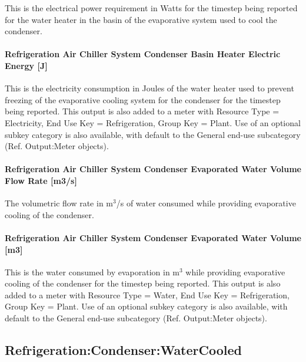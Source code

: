 This is the electrical power requirement in Watts for the timestep being reported for the water heater in the basin of the evaporative system used to cool the condenser.

\paragraph{Refrigeration Air Chiller System Condenser Basin Heater Electric Energy {[}J{]}}\label{refrigeration-air-chiller-system-condenser-basin-heater-electric-energy-j}

This is the electricity consumption in Joules of the water heater used to prevent freezing of the evaporative cooling system for the condenser for the timestep being reported. This output is also added to a meter with Resource Type = Electricity, End Use Key = Refrigeration, Group Key = Plant. Use of an optional subkey category is also available, with default to the General end-use subcategory (Ref. Output:Meter objects).

\paragraph{Refrigeration Air Chiller System Condenser Evaporated Water Volume Flow Rate {[}m3/s{]}}\label{refrigeration-air-chiller-system-condenser-evaporated-water-volume-flow-rate-m3s}

The volumetric flow rate in m\(^{3}\)/s of water consumed while providing evaporative cooling of the condenser.

\paragraph{Refrigeration Air Chiller System Condenser Evaporated Water Volume {[}m3{]}}\label{refrigeration-air-chiller-system-condenser-evaporated-water-volume-m3}

This is the water consumed by evaporation in m\(^{3}\) while providing evaporative cooling of the condenser for the timestep being reported. This output is also added to a meter with Resource Type = Water, End Use Key = Refrigeration, Group Key = Plant. Use of an optional subkey category is also available, with default to the General end-use subcategory (Ref. Output:Meter objects).

\subsection{Refrigeration:Condenser:WaterCooled}\label{refrigerationcondenserwatercooled}

